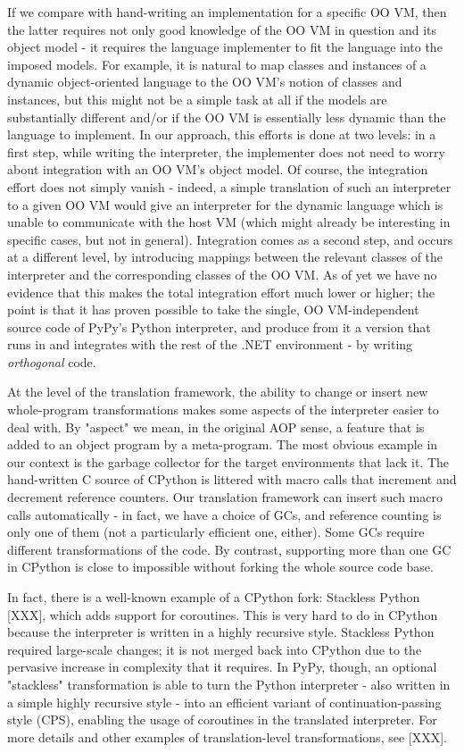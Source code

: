 \documentclass{llncs}
\begin{document}
If we compare with hand-writing an implementation for a specific OO VM,
then the latter requires not only good knowledge of the OO VM in
question and its object model - it requires the language implementer to
fit the language into the imposed models.  For example, it is natural to
map classes and instances of a dynamic object-oriented language to the
OO VM's notion of classes and instances, but this might not be a simple
task at all if the models are substantially different and/or if the OO
VM is essentially less dynamic than the language to implement.  In our
approach, this efforts is done at two levels: in a first step, while
writing the interpreter, the implementer does not need to worry about
integration with an OO VM's object model.  Of course, the integration
effort does not simply vanish - indeed, a simple translation of such an
interpreter to a given OO VM would give an interpreter for the dynamic
language which is unable to communicate with the host VM (which might
already be interesting in specific cases, but not in general).
Integration comes as a second step, and occurs at a different level, by
introducing mappings between the relevant classes of the interpreter and
the corresponding classes of the OO VM.  As of yet we have no evidence
that this makes the total integration effort much lower or higher; the
point is that it has proven possible to take the single, OO
VM-independent source code of PyPy's Python interpreter, and produce
from it a version that runs in and integrates with the rest of the .NET
environment - by writing \emph{orthogonal} code.

At the level of the translation framework, the ability to change or
insert new whole-program transformations makes some aspects of the
interpreter easier to deal with.  By "aspect" we mean, in the original
AOP sense, a feature that is added to an object program by a
meta-program.  The most obvious example in our context is the garbage
collector for the target environments that lack it.  The hand-written C
source of CPython is littered with macro calls that increment and
decrement reference counters.  Our translation framework can insert such
macro calls automatically - in fact, we have a choice of GCs, and
reference counting is only one of them (not a particularly efficient
one, either).  Some GCs require different transformations of the code.
By contrast, supporting more than one GC in CPython is close to
impossible without forking the whole source code base.

In fact, there is a well-known example of a CPython fork: Stackless
Python [XXX], which adds support for coroutines.  This is very hard to
do in CPython because the interpreter is written in a highly recursive
style.  Stackless Python required large-scale changes; it is not merged
back into CPython due to the pervasive increase in complexity that it
requires.  In PyPy, though, an optional "stackless" transformation is
able to turn the Python interpreter - also written in a simple highly
recursive style - into an efficient variant of continuation-passing
style (CPS), enabling the usage of coroutines in the translated
interpreter.  For more details and other examples of translation-level
transformations, see [XXX].
\end{document}
